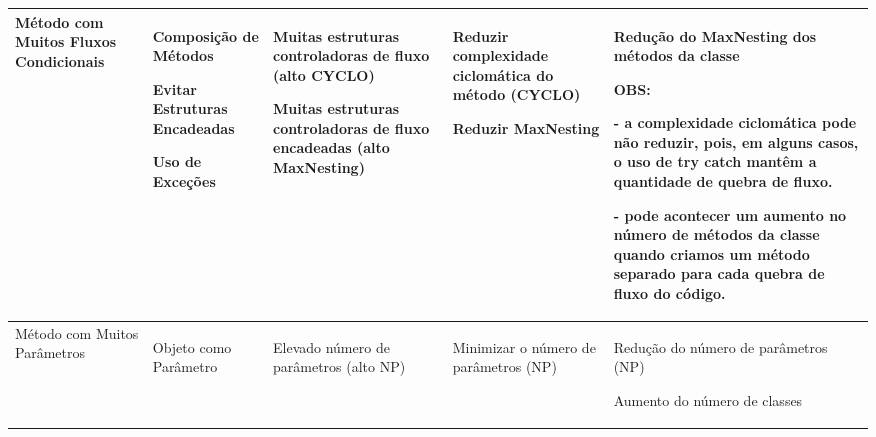 \begin{landscape}
\begin{table}[hbt]
\begin{tabular}{|p{3cm}|p{4.5cm}|p{5.0cm}|p{5.5cm}|p{5.0cm}|}
\hline 
Método com Muitos Fluxos Condicionais                           
& \begin{my_itemize}
    \item Composição de Métodos
	\item Evitar Estruturas Encadeadas
	\item Uso de Exceções
  \end{my_itemize}
& \begin{my_itemize}
	\item Muitas estruturas controladoras de fluxo (alto CYCLO)
	\item Muitas estruturas controladoras de fluxo encadeadas (alto MaxNesting)   
   \end{my_itemize}
& \begin{my_itemize}
	\item Reduzir complexidade ciclomática do método (CYCLO)
	\item Reduzir MaxNesting
  \end{my_itemize}
& \begin{my_itemize}
	\item Redução do MaxNesting dos métodos da classe
	\item OBS:
		\item[-] a complexidade ciclomática pode não reduzir, pois, em alguns casos, o uso de try catch mantêm a quantidade de quebra de fluxo.         
		\item[-] pode acontecer um aumento no número de métodos da classe quando criamos um método separado para cada quebra de fluxo do código.
  \end{my_itemize}
\tabularnewline                          
       
\hline 
Método com Muitos Parâmetros                         
& \begin{my_itemize}
    \item Objeto como Parâmetro
  \end{my_itemize}
& \begin{my_itemize}                            
    \item Elevado número de parâmetros (alto NP)
   \end{my_itemize}
& \begin{my_itemize}
	\item Minimizar o número de parâmetros (NP)
  \end{my_itemize}
& \begin{my_itemize}                           
	\item Redução do número de parâmetros (NP)
	\item Aumento do número de classes
  \end{my_itemize}
\tabularnewline                              


\end{tabular}
\end{table}
\end{landscape}
